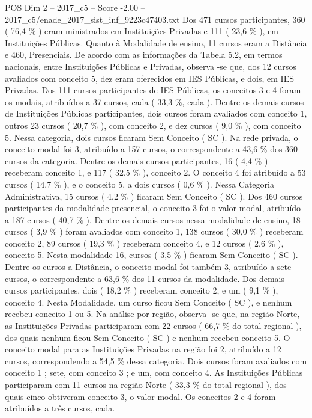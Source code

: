 \begin{textsample}{POS Dim 2 – 2017\_c5 – Score -2.00 – 2017\_c5/enade\_2017\_sist\_inf\_9223c47403.txt}
Dos 471 cursos participantes, 360 ( 76,4 \% ) eram ministrados em Instituições Privadas e 111 ( 23,6 \% ), em Instituições Públicas.
Quanto à Modalidade de ensino, 11 cursos eram a Distância e 460, Presenciais.
De acordo com as informações da Tabela 5.2, em termos nacionais, entre Instituições Públicas e Privadas, observa -se que, dos 12 cursos avaliados com conceito 5, dez eram oferecidos em IES Públicas, e dois, em IES Privadas.
Dos 111 cursos participantes de IES Públicas, os conceitos 3 e 4 foram os modais, atribuídos a 37 cursos, cada ( 33,3 \%, cada ).
Dentre os demais cursos de Instituições Públicas participantes, dois cursos foram avaliados com conceito 1, outros 23 cursos ( 20,7 \% ), com conceito 2, e dez cursos ( 9,0 \% ), com conceito 5.
Nessa categoria, dois cursos ficaram Sem Conceito ( SC ).
Na rede privada, o conceito modal foi 3, atribuído a 157 cursos, o correspondente a 43,6 \% dos 360 cursos da categoria.
Dentre os demais cursos participantes, 16 ( 4,4 \% ) receberam conceito 1, e 117 ( 32,5 \% ), conceito 2.
O conceito 4 foi atribuído a 53 cursos ( 14,7 \% ), e o conceito 5, a dois cursos ( 0,6 \% ).
Nessa Categoria Administrativa, 15 cursos ( 4,2 \% ) ficaram Sem Conceito ( SC ).
Dos 460 cursos participantes da modalidade presencial, o conceito 3 foi o valor modal, atribuído a 187 cursos ( 40,7 \% ).
Dentre os demais cursos nessa modalidade de ensino, 18 cursos ( 3,9 \% ) foram avaliados com conceito 1, 138 cursos ( 30,0 \% ) receberam conceito 2, 89 cursos ( 19,3 \% ) receberam conceito 4, e 12 cursos ( 2,6 \% ), conceito 5.
Nesta modalidade 16, cursos ( 3,5 \% ) ficaram Sem Conceito ( SC ).
Dentre os cursos a Distância, o conceito modal foi também 3, atribuído a sete cursos, o correspondente a 63,6 \% dos 11 cursos da modalidade.
Dos demais cursos participantes, dois ( 18,2 \% ) receberam conceito 2, e um ( 9,1 \% ), conceito 4.
Nesta Modalidade, um curso ficou Sem Conceito ( SC ), e nenhum recebeu conceito 1 ou 5.
Na análise por região, observa -se que, na região Norte, as Instituições Privadas participaram com 22 cursos ( 66,7 \% do total regional ), dos quais nenhum ficou Sem Conceito ( SC ) e nenhum recebeu conceito 5.
O conceito modal para as Instituições Privadas na região foi 2, atribuído a 12 cursos, correspondendo a 54,5 \% dessa categoria.
Dois cursos foram avaliados com conceito 1 ; sete, com conceito 3 ; e um, com conceito 4.
As Instituições Públicas participaram com 11 cursos na região Norte ( 33,3 \% do total regional ), dos quais cinco obtiveram conceito 3, o valor modal.
Os conceitos 2 e 4 foram atribuídos a três cursos, cada.

\end{textsample}
